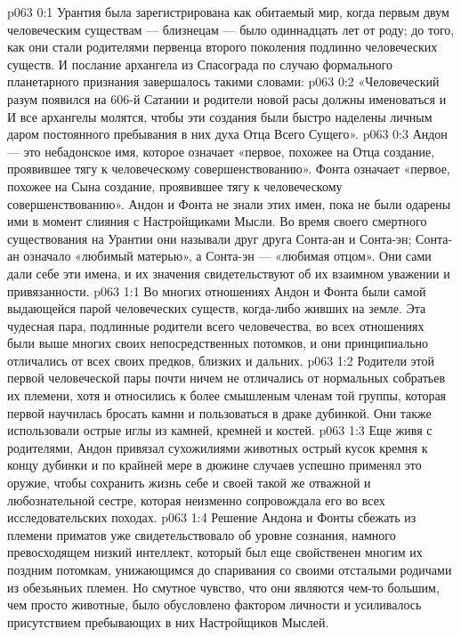 \author{Носитель Жизни}
\vs p063 0:1 Урантия была зарегистрирована как обитаемый мир, когда первым двум человеческим существам --- близнецам --- было одиннадцать лет от роду; до того, как они стали родителями первенца второго поколения подлинно человеческих существ. И послание архангела из Спасограда по случаю формального планетарного признания завершалось такими словами:
\vs p063 0:2 «Человеческий разум появился на 606\hyp{}й Сатании и родители новой расы должны именоваться  и  И все архангелы молятся, чтобы эти создания были быстро наделены личным даром постоянного пребывания в них духа Отца Всего Сущего».
\vs p063 0:3 \pc Андон --- это небадонское имя, которое означает «первое, похожее на Отца создание, проявившее тягу к человеческому совершенствованию». Фонта означает «первое, похожее на Сына создание, проявившее тягу к человеческому совершенствованию». Андон и Фонта не знали этих имен, пока не были одарены ими в момент слияния с Настройщиками Мысли. Во время своего смертного существования на Урантии они называли друг друга Сонта\hyp{}ан и Сонта\hyp{}эн; Сонта\hyp{}ан означало «любимый матерью», а Сонта\hyp{}эн --- «любимая отцом». Они сами дали себе эти имена, и их значения свидетельствуют об их взаимном уважении и привязанности.
\vs p063 1:1 Во многих отношениях Андон и Фонта были самой выдающейся парой человеческих существ, когда\hyp{}либо живших на земле. Эта чудесная пара, подлинные родители всего человечества, во всех отношениях были выше многих своих непосредственных потомков, и они принципиально отличались от всех своих предков, близких и дальних.
\vs p063 1:2 Родители этой первой человеческой пары почти ничем не отличались от нормальных собратьев их племени, хотя и относились к более смышленым членам той группы, которая первой научилась бросать камни и пользоваться в драке дубинкой. Они также использовали острые иглы из камней, кремней и костей.
\vs p063 1:3 Еще живя с родителями, Андон привязал сухожилиями животных острый кусок кремня к концу дубинки и по крайней мере в дюжине случаев успешно применял это оружие, чтобы сохранить жизнь себе и своей такой же отважной и любознательной сестре, которая неизменно сопровождала его во всех исследовательских походах.
\vs p063 1:4 Решение Андона и Фонты сбежать из племени приматов уже свидетельствовало об уровне сознания, намного превосходящем низкий интеллект, который был еще свойственен многим их поздним потомкам, унижающимся до спаривания со своими отсталыми родичами из обезьяньих племен. Но смутное чувство, что они являются чем\hyp{}то большим, чем просто животные, было обусловлено фактором личности и усиливалось присутствием пребывающих в них Настройщиков Мыслей.
